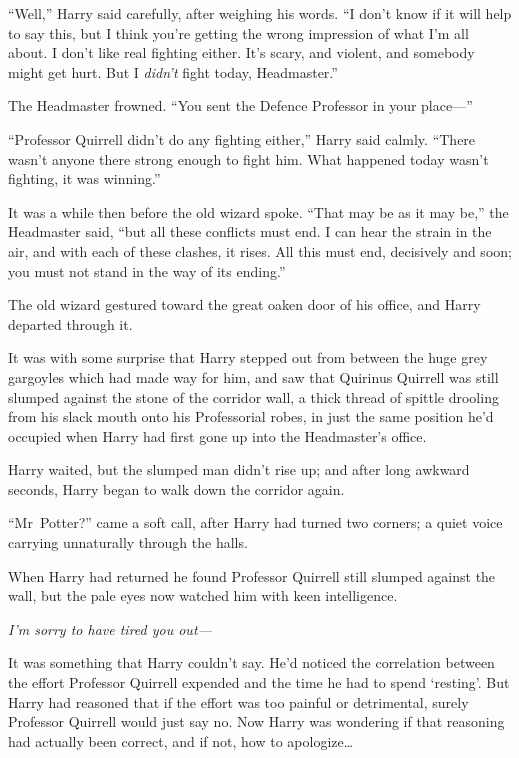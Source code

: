 “Well,” Harry said carefully, after weighing his words. “I don’t know if it will help to say this, but I think you’re getting the wrong impression of what I’m all about. I don’t like real fighting either. It’s scary, and violent, and somebody might get hurt. But I \emph{didn’t} fight today, Headmaster.”

The Headmaster frowned. “You sent the Defence Professor in your place—”

“Professor Quirrell didn’t do any fighting either,” Harry said calmly. “There wasn’t anyone there strong enough to fight him. What happened today wasn’t fighting, it was winning.”

It was a while then before the old wizard spoke. “That may be as it may be,” the Headmaster said, “but all these conflicts must end. I can hear the strain in the air, and with each of these clashes, it rises. All this must end, decisively and soon; you must not stand in the way of its ending.”

The old wizard gestured toward the great oaken door of his office, and Harry departed through it.

\later

It was with some surprise that Harry stepped out from between the huge grey gargoyles which had made way for him, and saw that Quirinus Quirrell was still slumped against the stone of the corridor wall, a thick thread of spittle drooling from his slack mouth onto his Professorial robes, in just the same position he’d occupied when Harry had first gone up into the Headmaster’s office.

Harry waited, but the slumped man didn’t rise up; and after long awkward seconds, Harry began to walk down the corridor again.

“Mr~Potter?” came a soft call, after Harry had turned two corners; a quiet voice carrying unnaturally through the halls.

When Harry had returned he found Professor Quirrell still slumped against the wall, but the pale eyes now watched him with keen intelligence.

\emph{I’m sorry to have tired you out—}

It was something that Harry couldn’t say. He’d noticed the correlation between the effort Professor Quirrell expended and the time he had to spend ‘resting’. But Harry had reasoned that if the effort was too painful or detrimental, surely Professor Quirrell would just say no. Now Harry was wondering if that reasoning had actually been correct, and if not, how to apologize…

